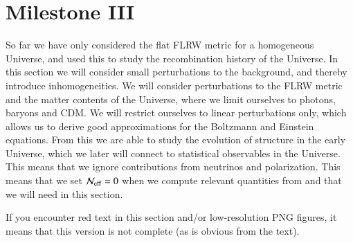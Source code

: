 \section{Milestone III}\label{sec:M3}
So far we have only considered the flat FLRW metric for a homogeneous Universe, and used this to study the recombination history of the Universe. In this section we will consider small perturbations to the background, and thereby introduce inhomogeneities. We will consider perturbations to the FLRW metric and the matter contents of the Universe, where we limit ourselves to photons, baryons and CDM. We will restrict ourselves to linear perturbations only, which allows us to derive good approximations for the Boltzmann and Einstein equations. From this we are able to study the evolution of structure in the early Universe, which we later will connect to statistical observables in the Universe. This means that we ignore contributions from neutrinos and polarization. This means that we set $\mathcal{N}_\mathrm{eff}=0$ when we compute relevant quantities from  and  that we will need in this section.    

If you encounter red text in this section and/or low-resolution PNG figures, it means that this version is not complete (as is obvious from the text). 






 